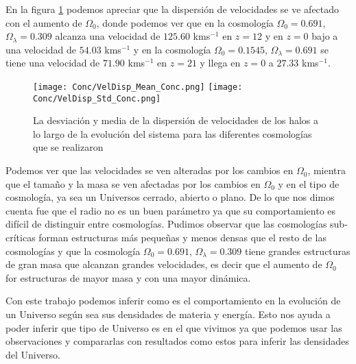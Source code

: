 En la figura \ref{fig:Conc_VelDisp} podemos apreciar que la dispersión de velocidades se ve afectado con el aumento de $\Omega_0$, donde podemos ver que en la cosmología $\Omega_0 = 0.691$, $\Omega_\lambda = 0.309$ alcanza una velocidad de $125.60$ kms$^{-1}$ en $z=12$ y en $z=0$ bajo a una velocidad de $54.03$ kms$^{-1}$ y en la cosmología  $\Omega_0 = 0.1545$, $\Omega_\lambda = 0.691$ se tiene una velocidad de $71.90$ kms$^{-1}$ en $z=21$ y llega en $z=0$ a $27.33$ kms$^{-1}$. 

\begin{figure}[H]
      \centering
      \texttt{[image: Conc/VelDisp\_Mean\_Conc.png]}
      \texttt{[image: Conc/VelDisp\_Std\_Conc.png]}
      \caption[Evolución de la desviación y media de la dispersión de velocidades los halos para todas las cosmologías]{La desviación y media de la dispersión de velocidades de los halos a lo largo de la evolución del sistema para las diferentes cosmologías que se realizaron}
      \label{fig:Conc_VelDisp}
\end{figure}

Podemos ver que las velocidades se ven alteradas por los cambios en $\Omega_0$, mientra que el tamaño y la masa se ven afectadas por los cambios en $\Omega_0$ y en el tipo de cosmología, ya sea un Universos cerrado, abierto o plano. De lo que nos dimos cuenta fue que el radio no es un buen parámetro ya que su comportamiento es difícil de distinguir entre cosmologías.  Pudimos observar que las cosmologías sub-críticas forman estructuras más pequeñas y menos densas que el resto de las cosmologías y que la cosmología $\Omega_0 = 0.691$, $\Omega_\lambda = 0.309$ tiene grandes estructuras de gran masa que alcanzan grandes velocidades, es decir que el aumento de $\Omega_0$ for estructuras de mayor masa y con una mayor dinámica.

Con este trabajo podemos inferir como es el comportamiento en la evolución de un Universo según sea sus densidades de materia y energía. Esto nos ayuda a poder inferir que tipo de Universo es en el que vivimos ya que podemos usar las observaciones y compararlas con resultados como estos para inferir las densidades del Universo.
 

\lhead[\fancyplain{}{}]%
      {\fancyplain{}{\bfseries\rightmark}}

